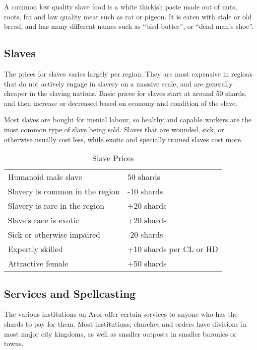 A common low quality slave food is a white thickish paste made out of nuts,
roots, fat and law quality meat such as rat or pigeon. It is eaten with
stale or old bread, and has many different names such as ``bird butter'',
or ``dead man's shoe''.

\subsection{Slaves}
\label{sec:Slave Prices}

The prices for slaves varies largely per region. They are most expensive in
regions that do not actively engage in slavery on a massive scale, and are
generally cheaper in the slaving nations. Basic prices for slaves start at
around 50 shards, and then increase or decreased based on economy and
condition of the slave.

Most slaves are bought for menial labour, so healthy and capable workers are
the most common type of slave being sold. Slaves that are wounded, sick, or
otherwise usually cost less, while exotic and specially trained slaves cost
more.

\begin{table*}
  \caption{Slave Prices} \label{tbl:Slave Prices}
  \begin{tabular}{p{10cm} l}
    Humanoid male slave             &  50 shards \\
    Slavery is common in the region & -10 shards \\
    Slavery is rare in the region   & +20 shards \\
    Slave's race is exotic          & +20 shards \\
    Sick or otherwise impaired      & -20 shards \\
    Expertly skilled                & +10 shards per CL or HD \\
    Attractive female               & +50 shards
  \end{tabular}
\end{table*}

\subsection{Services and Spellcasting}
\label{sec:Services}

The various institutions on Aror offer certain services to anyone who has the
shards to pay for them. Most institutions, churches and orders have divisions
in most major city kingdoms, as well as smaller outposts in smaller baronies
or towns.

